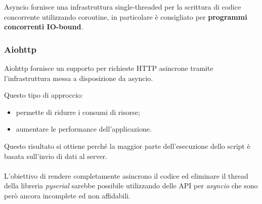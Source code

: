 Asyncio fornisce una infrastruttura single-threaded per la scrittura di codice concorrente utilizzando coroutine, in particolare è consigliato per \textbf{programmi concorrenti IO-bound}. 

\subsubsection{Aiohttp}
Aiohttp fornisce un supporto per richieste HTTP asincrone tramite l'infrastruttura messa a disposizione da asyncio.

Questo tipo di approccio:
\begin{itemize}
	\item permette di ridurre i consumi di risorse;
	\item aumentare le performance dell'applicazione.
\end{itemize}
Questo risultato si ottiene perché la maggior parte dell'esecuzione dello script è basata sull'invio di dati al server.\\\\
L'obiettivo di rendere completamente asincrono il codice ed eliminare il thread della libreria \textit{pyserial} sarebbe possibile utilizzando delle API per \textit{asyncio} che sono però ancora incomplete ed non affidabili.